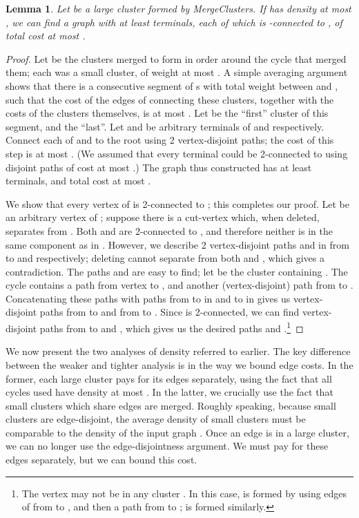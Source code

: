 \documentclass[11pt]{article}
\newtheorem{lemma}{Lemma}[section]
\begin{document}
\begin{lemma}\label{lem:segment}
  Let  be a large cluster formed by {\sc MergeClusters}. If  has
  density at most , we can find a graph  with at least 
  terminals, each of which is -connected to , of total cost at
  most .
\end{lemma}
\begin{proof}
  Let  be the clusters merged to form  in
  order around the cycle  that merged them; each  was a small
  cluster, of weight at most . A simple averaging argument shows
  that there is a consecutive segment of s with total weight
  between  and , such that the cost of the edges of 
  connecting these clusters, together with the costs of the clusters
  themselves, is at most . Let  be the ``first''
  cluster of this segment, and  the ``last''. Let  and  be
  arbitrary terminals of  and  respectively. Connect each of
   and  to the root  using 2 vertex-disjoint paths; the cost
  of this step is at most . (We assumed that every terminal could
  be 2-connected to  using disjoint paths of cost at most .)
  The graph  thus constructed has at least  terminals, and
  total cost at most .  

  We show that every vertex  of  is 2-connected to ; this
  completes our proof. Let  be an arbitrary vertex of ; suppose
  there is a cut-vertex  which, when deleted, separates  from
  . Both  and  are 2-connected to , and therefore neither
  is in the same component as  in . However, we describe 2
  vertex-disjoint paths  and  in  from  to  and
   respectively; deleting  cannot separate  from both  and
  , which gives a contradiction. The paths  and  are easy
  to find; let  be the cluster containing . The cycle 
  contains a path from vertex  to , and
  another (vertex-disjoint) path from  to .
  Concatenating these paths with paths from  to  in  and
   to  in  gives us vertex-disjoint paths  from 
  to  and  from  to . Since  is 2-connected, we
  can find vertex-disjoint paths from  to  and , which
  gives us the desired paths  and .\footnote{The vertex 
    may not be in any cluster . In this case,  is formed by
    using edges of  from  to , and then a path from
     to ;  is formed similarly.}
\end{proof}

\bigskip
We now present the two analyses of density referred to earlier. The
key difference between the weaker and tighter analysis is in the way
we bound edge costs. In the former, each large cluster pays for its
edges separately, using the fact that all cycles used have density at
most . In the latter, we crucially use the fact
that small clusters which share edges are merged. Roughly speaking,
because small clusters are edge-disjoint, the average density of small
clusters must be comparable to the density of the input graph
. Once an edge is in a large cluster, we can no longer use the
edge-disjointness argument. We must pay for these edges separately,
but we can bound this cost.
\end{document}
